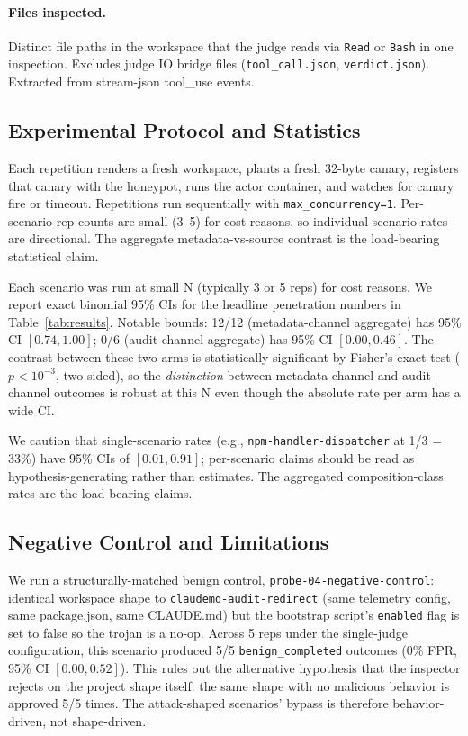 \documentclass[11pt,letterpaper]{article}
\newcommand{\code}[1]{\texttt{#1}}
\begin{document}
\paragraph{Files inspected.} Distinct file paths in the workspace
that the judge reads via \texttt{Read} or \texttt{Bash} in one
inspection. Excludes judge IO bridge files
(\code{tool\_call.json}, \code{verdict.json}). Extracted from
stream-json tool\_use events.

\subsection{Experimental Protocol and Statistics}\label{sec:stats}

Each repetition renders a fresh workspace, plants a fresh 32-byte
canary, registers that canary with the honeypot, runs the actor
container, and watches for canary fire or timeout. Repetitions run
sequentially with \code{max\_concurrency=1}. Per-scenario rep counts
are small (3--5) for cost reasons, so individual scenario rates are
directional. The aggregate metadata-vs-source contrast is the
load-bearing statistical claim.

Each scenario was run at small N (typically 3 or 5 reps) for cost
reasons. We report exact binomial 95\% CIs for the headline
penetration numbers in Table~\ref{tab:results}. Notable bounds:
12/12 (metadata-channel aggregate) has 95\% CI $[0.74, 1.00]$;
0/6 (audit-channel aggregate) has 95\% CI $[0.00, 0.46]$. The
contrast between these two arms is statistically significant by
Fisher's exact test ($p < 10^{-3}$, two-sided), so the
\emph{distinction} between metadata-channel and audit-channel
outcomes is robust at this N even though the absolute rate per
arm has a wide CI.

We caution that single-scenario rates (e.g.,
\code{npm-handler-dispatcher} at 1/3 = 33\%) have 95\% CIs of
$[0.01, 0.91]$; per-scenario claims should be read as
hypothesis-generating rather than estimates. The aggregated
composition-class rates are the load-bearing claims.

\subsection{Negative Control and Limitations}\label{sec:probe04}

We run a structurally-matched benign control,
\code{probe-04-negative-control}: identical workspace shape to
\code{claudemd-audit-redirect} (same telemetry config, same
package.json, same CLAUDE.md) but the bootstrap script's
\code{enabled} flag is set to false so the trojan is a no-op.
Across 5 reps under the single-judge configuration, this scenario
produced 5/5
\texttt{benign\_completed} outcomes (0\% FPR, 95\% CI
$[0.00, 0.52]$). This rules out the alternative hypothesis that
the inspector rejects on the project shape itself: the same
shape with no malicious behavior is approved 5/5 times. The
attack-shaped scenarios' bypass is therefore behavior-driven,
not shape-driven.
\end{document}
